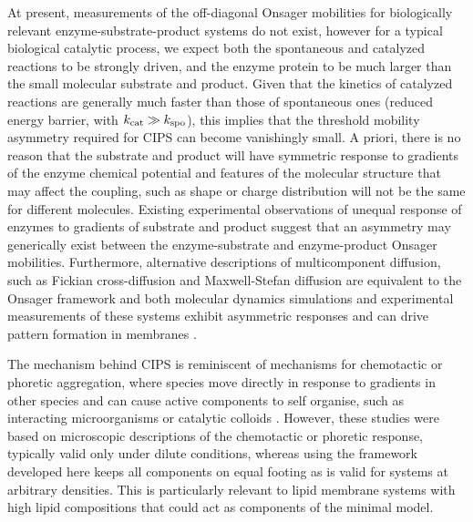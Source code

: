 At present, measurements of the off-diagonal Onsager mobilities for biologically relevant enzyme-substrate-product systems do not exist, however for a typical biological catalytic process, we expect both the spontaneous and catalyzed reactions to be strongly driven, and the enzyme protein to be much larger than the small molecular substrate and product. Given that the kinetics of catalyzed reactions are generally much faster than those of spontaneous ones (reduced energy barrier, with $k_{\mathrm{cat}}\gg k_{\mathrm{spo}}$), this implies that the threshold mobility asymmetry required for CIPS can become vanishingly small. A priori, there is no reason that the substrate and product will have symmetric response to gradients of the enzyme chemical potential and features of the molecular structure that may affect the coupling, such as shape or charge distribution will not be the same for different molecules. Existing experimental observations \cite{agudo-canalejo_phoresis_2018,zhang_chemically-powered_2021} of unequal response of enzymes to gradients of substrate and product suggest that an asymmetry may generically exist between the enzyme-substrate and enzyme-product Onsager mobilities. Furthermore, alternative descriptions of multicomponent diffusion, such as Fickian cross-diffusion \cite{vanag_cross-diffusion_2009} and Maxwell-Stefan diffusion \cite{taylor_multicomponent_1993} are equivalent to the Onsager framework and both molecular dynamics simulations and experimental measurements of these systems exhibit asymmetric responses \cite{guevara-carrion_mutual_2016, guevara-carrion_interplay_2018} and can drive pattern formation in membranes \cite{ramm_diffusiophoretic_2021}.

The mechanism behind CIPS is reminiscent of mechanisms for chemotactic or phoretic aggregation, where species move directly in response to gradients in other species \cite{keller_initiation_1970, golestanian_phoretic_2019} and can cause active components to self organise, such as interacting microorganisms or catalytic colloids \cite{saha_clusters_2014,agudo-canalejo_active_2019}. However, these studies were based on microscopic descriptions of the chemotactic or phoretic response, typically valid only under dilute conditions, whereas using the framework developed here keeps all components on equal footing as is valid for systems at arbitrary densities. This is particularly relevant to lipid membrane systems with high lipid compositions that could act as components of the minimal model.

